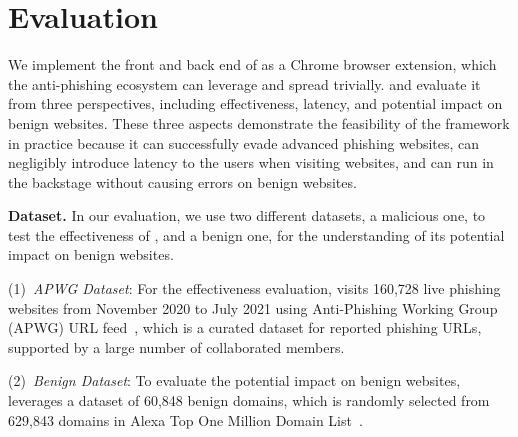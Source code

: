 


\section{Evaluation}
\label{s:eval}

We implement the front and back end of \spartacus as a Chrome browser extension, which the anti-phishing ecosystem can leverage and spread trivially.
and evaluate it from three perspectives, including effectiveness, latency, and potential impact on benign websites.
These three aspects demonstrate the feasibility of the \spartacus framework in practice because it can successfully evade advanced phishing websites, can negligibly introduce latency to the users when visiting websites, and can run in the backstage without causing errors on benign websites.

\noindent
\textbf{Dataset.}
In our evaluation, we use two different datasets, a malicious one, to test the effectiveness of \spartacus, and a benign one, for the understanding of its potential impact on benign websites.

\noindent
(1)~\emph{APWG Dataset}:
For the effectiveness evaluation, \spartacus visits 160,728 live phishing websites from November 2020 to July 2021 using Anti-Phishing Working Group (APWG) URL feed~\cite{ecrimeexchange},
which is a curated dataset for reported phishing URLs, supported by a large number of collaborated members.

\noindent
(2)~\emph{Benign Dataset}:
To evaluate the potential impact on benign websites, \spartacus leverages a dataset of 60,848 benign domains, which is randomly selected from 629,843 domains in Alexa Top One Million Domain List~\cite{AlexaTop1M}.






